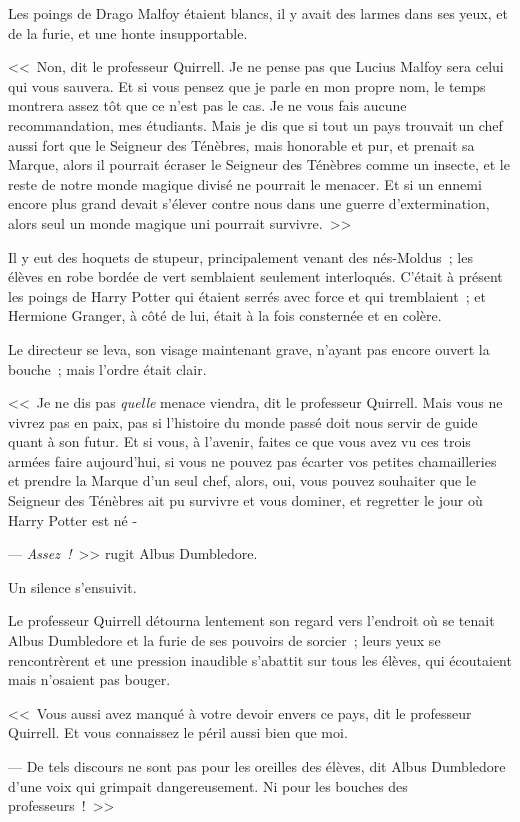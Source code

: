 Les poings de Drago Malfoy étaient blancs, il y avait des larmes dans ses yeux, et de la furie, et une honte insupportable.

<<~Non, dit le professeur Quirrell. Je ne pense pas que Lucius Malfoy sera celui qui vous sauvera. Et si vous pensez que je parle en mon propre nom, le temps montrera assez tôt que ce n'est pas le cas. Je ne vous fais aucune recommandation, mes étudiants. Mais je dis que si tout un pays trouvait un chef aussi fort que le Seigneur des Ténèbres, mais honorable et pur, et prenait sa Marque, alors il pourrait écraser le Seigneur des Ténèbres comme un insecte, et le reste de notre monde magique divisé ne pourrait le menacer. Et si un ennemi encore plus grand devait s'élever contre nous dans une guerre d'extermination, alors seul un monde magique uni pourrait survivre.~>>

Il y eut des hoquets de stupeur, principalement venant des nés-Moldus~; les élèves en robe bordée de vert semblaient seulement interloqués. C'était à présent les poings de Harry Potter qui étaient serrés avec force et qui tremblaient~; et Hermione Granger, à côté de lui, était à la fois consternée et en colère.

Le directeur se leva, son visage maintenant grave, n'ayant pas encore ouvert la bouche~; mais l'ordre était clair.

<<~Je ne dis pas \emph{quelle} menace viendra, dit le professeur Quirrell. Mais vous ne vivrez pas en paix, pas si l'histoire du monde passé doit nous servir de guide quant à son futur. Et si vous, à l'avenir, faites ce que vous avez vu ces trois armées faire aujourd'hui, si vous ne pouvez pas écarter vos petites chamailleries et prendre la Marque d'un seul chef, alors, oui, vous pouvez souhaiter que le Seigneur des Ténèbres ait pu survivre et vous dominer, et regretter le jour où Harry Potter est né -

--- \emph{Assez~!}~>> rugit Albus Dumbledore.

Un silence s'ensuivit.

Le professeur Quirrell détourna lentement son regard vers l'endroit où se tenait Albus Dumbledore et la furie de ses pouvoirs de sorcier~; leurs yeux se rencontrèrent et une pression inaudible s'abattit sur tous les élèves, qui écoutaient mais n'osaient pas bouger.

<<~Vous aussi avez manqué à votre devoir envers ce pays, dit le professeur Quirrell. Et vous connaissez le péril aussi bien que moi.

--- De tels discours ne sont pas pour les oreilles des élèves, dit Albus Dumbledore d'une voix qui grimpait dangereusement. Ni pour les bouches des professeurs~!~>>

